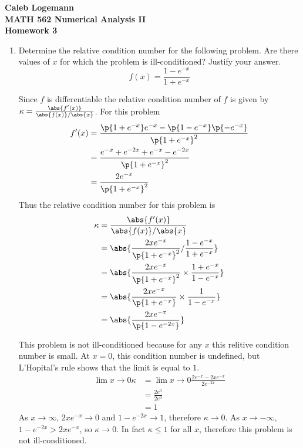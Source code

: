 \documentclass[11pt]{article}
\begin{document}
\noindent \textbf{\Large{Caleb Logemann \\
MATH 562 Numerical Analysis II \\
Homework 3
}}

%
\begin{enumerate}
    \item %
        Determine the relative condition number for the following problem.
        Are there values of $x$ for which the problem is ill-conditioned?
        Justify your answer.
        \[
            f(x) = \frac{1 - e^{-x}}{1 + e^{-x}}
        \]

        Since $f$ is differentiable the relative condition number of $f$ is given by
        $\kappa = \frac{\abs{f'(x)}}{\abs{f(x)}/\abs{x}}$.
        For this problem
        \begin{align*}
            f'(x) &= \frac{\p{1 + e^{-x}}e^{-x} - \p{1 - e^{-x}}\p{-e^{-x}}}{\p{1 + e^{-x}}^2} \\
                  &= \frac{e^{-x} + e^{-2x} + e^{-x} - e^{-2x}}{\p{1 + e^{-x}}^2} \\ 
                  &= \frac{2e^{-x}}{\p{1 + e^{-x}}^2} \\ 
        \end{align*}
        Thus the relative condition number for this problem is
        \begin{align*}
            \kappa &= \frac{\abs{f'(x)}}{\abs{f(x)}/\abs{x}} \\
                   &= \abs{\frac{2xe^{-x}}{\p{1 + e^{-x}}^2} / \frac{1 - e^{-x}}{1 + e^{-x}}} \\
                   &= \abs{\frac{2xe^{-x}}{\p{1 + e^{-x}}^2} \times \frac{1 + e^{-x}}{1 - e^{-x}}} \\
                   &= \abs{\frac{2xe^{-x}}{\p{1 + e^{-x}}} \times \frac{1}{1 - e^{-x}}} \\
                   &= \abs{\frac{2xe^{-x}}{\p{1 - e^{-2x}}}} \\
        \end{align*}

        This problem is not ill-conditioned because for any $x$ this relitive
        condition number is small.
        At $x = 0$, this condition number is undefined, but L'Hopital's rule
        shows that the limit is equal to $1$.
        \begin{align*}
            \lim{x \to 0}{\kappa} &= \lim{x \to 0}{\frac{2 e^{-x} - 2 x e^{-x}}{2 e^{-2x}}} \\
                                  &= \frac{2 e^{0}}{2 e^{0}} \\
                                  &= 1
        \end{align*}
        As $x \to \infty$, $2xe^{-x} \to 0$ and $1 - e^{-2x} \to 1$, therefore $\kappa \to 0$.
        As $x \to -\infty$, $1 - e^{-2x} > 2xe^{-x}$, so $\kappa \to 0$.
        In fact $\kappa \le 1$ for all $x$, therefore this problem is not
        ill-conditioned.


\end{enumerate}
\end{document}
